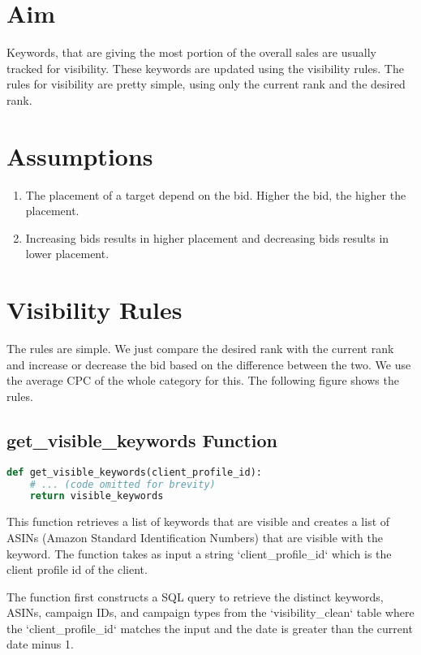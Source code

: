 \section{Aim}

Keywords, that are giving the most portion of the overall sales are usually tracked for visibility. These keywords are updated using the visibility rules. The rules for visibility are pretty simple, using only the current rank and the desired rank.

\section{Assumptions}

\begin{enumerate}
    \item The placement of a target depend on the bid. Higher the bid, the higher the placement.
    \item Increasing bids results in higher placement and decreasing bids results in lower placement.
\end{enumerate}

\section{Visibility Rules}

The rules are simple. We just compare the desired rank with the current rank and increase or decrease the bid based on the difference between the two. We use the average CPC of the whole category for this. The following figure shows the rules.

\subsection{get\_visible\_keywords Function}

\begin{lstlisting}[language=Python]
def get_visible_keywords(client_profile_id):
    # ... (code omitted for brevity)
    return visible_keywords
\end{lstlisting}

This function retrieves a list of keywords that are visible and creates a list of ASINs (Amazon Standard Identification Numbers) that are visible with the keyword. The function takes as input a string `client\_profile\_id` which is the client profile id of the client.

The function first constructs a SQL query to retrieve the distinct keywords, ASINs, campaign IDs, and campaign types from the `visibility\_clean` table where the `client\_profile\_id` matches the input and the date is greater than the current date minus 1.

